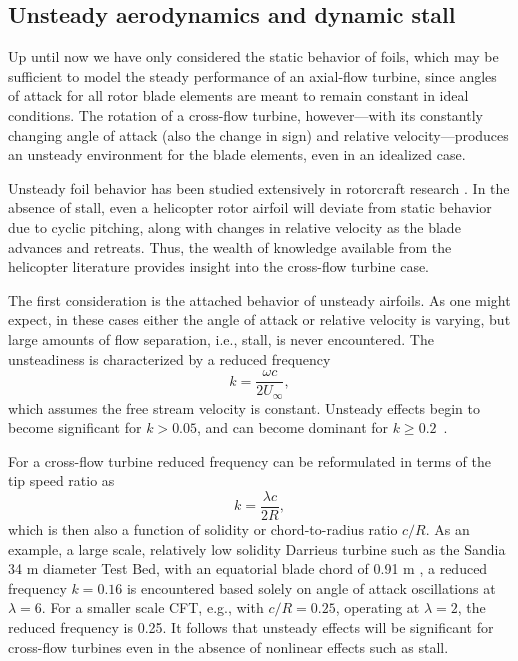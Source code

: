 \subsection{Unsteady aerodynamics and dynamic stall}

Up until now we have only considered the static behavior of foils, which may be
sufficient to model the steady performance of an axial-flow turbine, since
angles of attack for all rotor blade elements are meant to remain constant in
ideal conditions. The rotation of a cross-flow turbine, however---with its
constantly changing angle of attack (also the change in sign) and relative
velocity---produces an unsteady environment for the blade elements, even in an
idealized case.

Unsteady foil behavior has been studied extensively in rotorcraft research
\cite{Leishman2006}. In the absence of stall, even a helicopter rotor airfoil
will deviate from static behavior due to cyclic pitching, along with changes in
relative velocity as the blade advances and retreats. Thus, the wealth of
knowledge available from the helicopter literature provides insight into the
cross-flow turbine case.

The first consideration is the attached behavior of unsteady airfoils. As one
might expect, in these cases either the angle of attack or relative velocity is
varying, but large amounts of flow separation, i.e., stall, is never
encountered. The unsteadiness is characterized by a reduced
frequency~\cite{Leishman2006}
\begin{equation}
    k = \frac{\omega c}{2 U_\infty},
\end{equation}
which assumes the free stream velocity is constant. Unsteady effects begin to
become significant for $k > 0.05$, and can become dominant for $k \ge
0.2$~\cite{Leishman2006}.


For a cross-flow turbine reduced frequency can be reformulated in terms of the
tip speed ratio as
\begin{equation}
    k = \frac{\lambda c}{2R},
\end{equation}
which is then also a function of solidity or chord-to-radius ratio $c/R$. As an
example, a large scale, relatively low solidity Darrieus turbine such as the
Sandia 34 m diameter Test Bed, with an equatorial blade chord of 0.91 m
\cite{Murray2011}, a reduced frequency $k=0.16$ is encountered based solely on
angle of attack oscillations at $\lambda=6$. For a smaller scale CFT, e.g., with
$c/R = 0.25$, operating at $\lambda = 2$, the reduced frequency is 0.25. It
follows that unsteady effects will be significant for cross-flow turbines even
in the absence of nonlinear effects such as stall.

